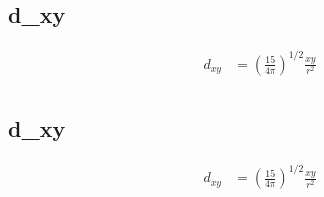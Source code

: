 \documentclass[10pt]{article} %
\begin{document}

\subsection{d_{xy}}
\begin{align*}
  d_{xy} &= \left(\frac{15}{4\pi}\right)^{1/2}\frac{xy}{r^2}\\
\end{align*}


\subsection{d_{xy}}
\begin{align*}
  d_{xy} &= \left(\frac{15}{4\pi}\right)^{1/2}\frac{xy}{r^2}\\
\end{align*}

\end{document}

